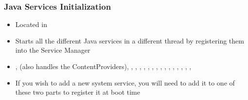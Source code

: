 \begin{frame}
  \frametitle{Java Services Initialization}
  \begin{itemize}
  \item Located in
  \item Starts all the different Java services in a different thread
    by registering them into the Service Manager
  \item {},  (also handles the
    ContentProviders), , ,
    , , ,
    , ,
    , ,
    , ,
    , ,
    , , 
  \item If you wish to add a new system service, you will need to add
    it to one of these two parts to register it at boot time
  \end{itemize}
\end{frame}
